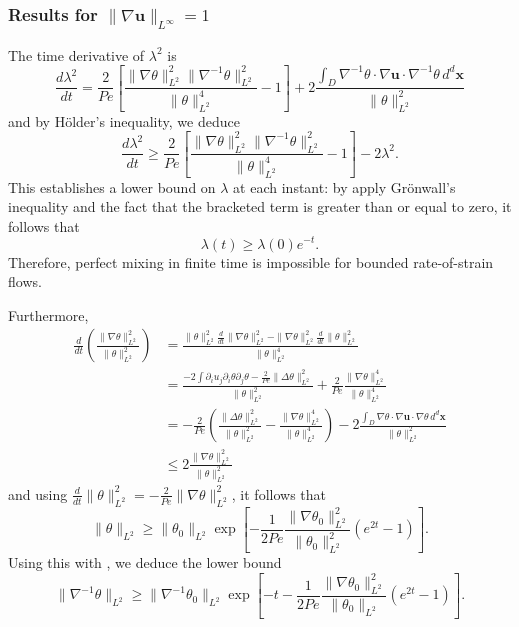 \documentclass[12pt]{iopart}
\newcommand{\ddt}[1]{\frac{d #1}{dt}}
\newcommand{\hmone}[1]{\|\nabla^{-1} #1\|_{L^{2}}}
\newcommand{\ltwo}[1]{\|#1\|_{L^{2}}}
\newcommand{\hone}[1]{\| \nabla #1\|_{L^{2}}}
\newcommand{\sint}[1]{\int_{D} #1 \, d^{d}\mathbf{x}}
\renewcommand{\vec}[1]{\mathbf{#1}}
\newcommand{\linf}[1]{\| #1 \|_{L^{\infty}}}
\begin{document}
\label{sec:linfty_flows}
\subsubsection{Results for $\linf{\nabla \vec{u}} = 1$}

The time derivative of $\lambda^2$ is
%
\begin{equation}
	\ddt{\lambda^2} = \frac{2}{Pe}
		\left[ 
			\frac{\hone{\theta}^2\hmone{\theta}^2}
					{\ltwo{\theta}^4}  
			- 1
		\right]
		+ 2 \frac{\sint{\nabla^{-1}\theta \cdot \nabla\vec{u} \cdot 
							\nabla^{-1}\theta  }}
					  {\ltwo{\theta}^{2}}
\end{equation}
and by H\"older's inequality, we deduce
\begin{equation}
\label{eq:length_ineq_rate-of-strain}
	\ddt{\lambda^2} \geq \frac{2}{Pe} \left[ 
			\frac{\hone{\theta}^2\hmone{\theta}^2}
					{\ltwo{\theta}^4}  
			- 1
		\right] - 2  \lambda^2 .
\end{equation}
This establishes a lower bound on $\lambda$ at each instant: by apply Gr\"onwall's inequality and the fact that the bracketed term is greater than or equal to zero, it follows that
%
\begin{equation}
\label{eq:exponential_enstrophy}
	\lambda (t) \geq \lambda(0)e^{- t}.
\end{equation}
%
Therefore, perfect mixing in finite time is impossible for bounded rate-of-strain flows.

Furthermore,
%
\numparts \begin{eqnarray}
\frac{d}{dt}\left(\frac{\|\nabla\theta\|_{L^{2}}^2}{\|\theta\|_{L^{2}}^2}\right) &= \frac{\|\theta\|_{L^{2}}^2\frac{d}{dt}\|\nabla\theta\|_{L^{2}}^2-\|\nabla\theta\|_{L^{2}}^2\frac{d}{dt}\|\theta\|_{L^{2}}^2}{\|\theta\|_{L^{2}}^4}\\
&= \frac{-2\int \partial_{i}u_{j}\partial_{i}\theta\partial_{j}\theta - \frac{2}{Pe} \|\Delta\theta\|_{L^{2}}^2}{\|\theta\|_{L^{2}}^2}+\frac{2}{Pe}\frac{\|\nabla\theta\|_{L^{2}}^4}{\|\theta\|_{L^{2}}^4} \\
&=-\frac{2}{Pe}\left(\frac{\|\Delta\theta\|_{L^{2}}^2}{\|\theta\|_{L^{2}}^2} - \frac{\|\nabla\theta\|_{L^{2}}^4}{\|\theta\|_{L^{2}}^4} \right) - 2\frac{\sint{\nabla\theta \cdot \nabla\vec{u} \cdot 
							\nabla\theta  }}{\|\theta\|_{L^{2}}^2} 
\\
&\leq 2 \frac{\hone{\theta}^2}{\ltwo{\theta}^2}
\end{eqnarray} \endnumparts
%
and using $\ddt{}\ltwo{\theta}^2 = -\frac{2}{Pe} \hone{\theta}^2$, it follows that
\begin{equation}
\ltwo{\theta}\geq  \ltwo{\theta_{0}}\exp\left[-\frac{1}{2Pe}\frac{\hone{\theta_{0}}^2}{\ltwo{\theta_{0}}^2}\left(e^{2 t} -1\right)\right].
\end{equation}
Using this with , we deduce the lower bound
\begin{equation}
\hmone{\theta} \geq  \hmone{\theta_{0}} \exp\left[- t -\frac{1}{2 Pe}\frac{\hone{\theta_{0}}^2}{\ltwo{\theta_{0}}}\left(e^{2 t} -1\right)\right].
\end{equation}
\end{document}

